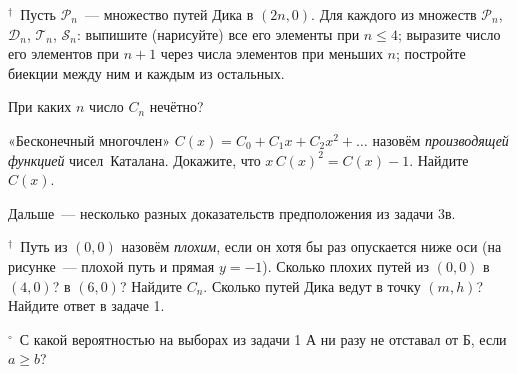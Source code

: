 \z \unskip$^{\dagger}$\ Пусть $\mathcal P_n$~— множество путей Дика в $(2n,0)$. Для каждого из множеств $\mathcal P_n$, $\mathcal D_n$, $\mathcal T_n$, $\mathcal S_n$:
 выпишите (нарисуйте) все его элементы при $n\le 4$;
 выразите число его элементов при $n+1$ через числа элементов при меньших $n$;
 постройте биекции между ним и каждым из остальных.

\zp При каких $n$ число $C_n$ нечётно?

\z «Бесконечный многочлен» $C(x)=C_0+C_1x+C_2x^2+\ldots$ назовём \textit{производящей функцией} чисел~Каталана.  Докажите, что $x\,C(x)^2=C(x)-1$.  Найдите $C(x)$.

\divby

Дальше~— несколько разных доказательств предположения из задачи 3в.

\par\noindent\begin{minipage}[t]{\dimexpr\linewidth-7.9cm-1.2em\relax}\vspace{0pt}
\z \unskip$^{\dagger}$\ Путь из $(0,0)$ назовём \textit{плохим}, если он хотя бы раз опускается ниже оси (на рисунке~— плохой путь и прямая $y=-1$).
 Сколько плохих путей из $(0,0)$ в $(4,0)$? в $(6,0)$?
 Найдите $C_n$.
 Сколько путей Дика ведут в точку $(m,h)$?
 Найдите ответ в задаче 1.

\end{minipage}\hfill\begin{minipage}[t]{7.9cm}\vspace{0pt}\centering {}\end{minipage}\par\vspace{6pt}

\zp \unskip$^{\circ}$\ С какой вероятностью на выборах из задачи 1 А ни разу не отставал от Б, если $a\ge b$?

